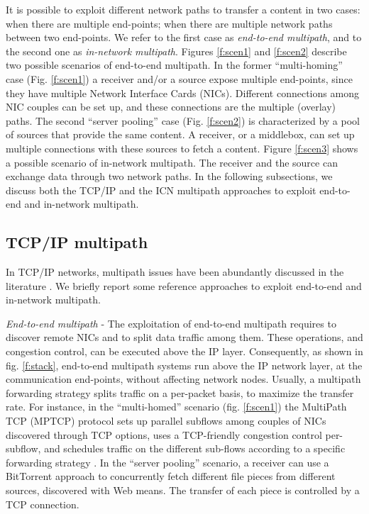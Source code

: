 \documentclass{sig-alternate-10pt}
\begin{document}
It is possible to exploit different network paths to transfer a content in two cases: when there are multiple end-points; when there are multiple network paths between two end-points. We refer to the first case as \emph{end-to-end multipath}, and to the second one as \emph{in-network multipath}.
Figures \ref{f:scen1} and \ref{f:scen2} describe two possible scenarios of end-to-end multipath. In the former ``multi-homing'' case (Fig. \ref{f:scen1}) a receiver and/or a source expose multiple end-points, since they have multiple Network Interface Cards (NICs). Different connections among NIC couples can be set up, and these connections are the multiple (overlay) paths.
The second ``server pooling'' case (Fig. \ref{f:scen2}) is characterized by a pool of sources that provide the same content. A receiver, or a middlebox, can set up multiple connections with these sources to fetch a content.
Figure \ref{f:scen3} shows a possible scenario of in-network multipath. The receiver and the source can exchange data through two network paths. In the following subsections, we discuss both the TCP/IP and the ICN multipath approaches to exploit end-to-end and in-network multipath.



\subsection*{TCP/IP multipath}
In TCP/IP networks, multipath issues have been abundantly discussed in the literature \cite{he2008toward}. We briefly report some reference approaches to exploit end-to-end and in-network multipath. 

\emph{End-to-end multipath} - The exploitation of end-to-end multipath requires to discover remote NICs and to split data traffic among them. These operations, and congestion control, can be executed above the IP layer. Consequently, as shown in fig. \ref{f:stack}, end-to-end multipath systems run above the IP network layer, at the communication end-points, without affecting network nodes. Usually, a multipath forwarding strategy splits traffic on a per-packet basis, to maximize the transfer rate. For instance, in the ``multi-homed'' scenario (fig. \ref{f:scen1}) the MultiPath TCP (MPTCP) protocol \cite{rfc6824} sets up parallel subflows among couples of NICs discovered through TCP options, uses a TCP-friendly congestion control per-subflow, and schedules traffic on the different sub-flows according to a specific forwarding strategy \cite{singh2012performance,wischik2011design}. In the ``server pooling'' scenario, a receiver can use a BitTorrent approach to concurrently fetch different file pieces from different sources, discovered with Web means. The transfer of each piece is controlled by a TCP connection.
\end{document}
